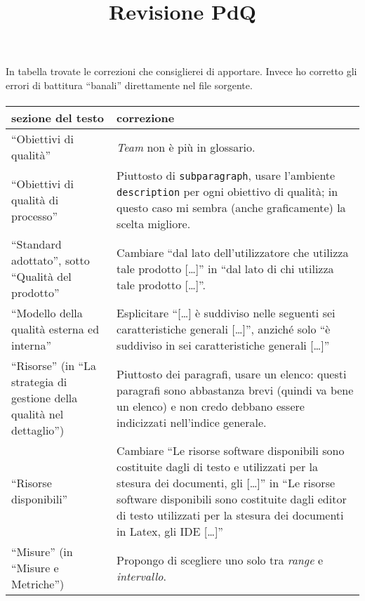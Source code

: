 \documentclass[a4paper]{article}
\title{Revisione PdQ}
\author{\GG}
\begin{document}
\maketitle

\paragraph{}
In tabella trovate le correzioni che consiglierei di apportare. Invece ho corretto gli errori di battitura “banali” direttamente nel file sorgente.

\paragraph{}
\begin{longtable}{| p{3cm} | p{10cm} |}
	\hline
	\textbf{sezione del testo} & \textbf{correzione} \\ \hline
	\hline
	“Obiettivi di qualità” & \emph{Team} non è più in glossario. \\ \hline
	“Obiettivi di qualità di processo” & Piuttosto di \texttt{subparagraph}, usare l'ambiente \texttt{description} per ogni obiettivo di qualità; in questo caso mi sembra (anche graficamente) la scelta migliore. \\ \hline
	“Standard adottato”, sotto “Qualità del prodotto” & Cambiare “dal lato dell’utilizzatore che utilizza tale prodotto [\dots]” in “dal lato di chi utilizza tale prodotto [\dots]”. \\ \hline
	“Modello della qualità esterna ed interna” & Esplicitare “[\dots] è suddiviso nelle seguenti sei caratteristiche generali [\dots]”, anziché solo “è suddiviso in sei caratteristiche generali [\dots]” \\ \hline
	“Risorse” (in “La strategia di gestione della qualità nel dettaglio”) & Piuttosto dei paragrafi, usare un elenco: questi paragrafi sono abbastanza brevi (quindi va bene un elenco) e non credo debbano essere indicizzati nell'indice generale. \\ \hline
	“Risorse disponibili” & Cambiare “Le risorse software disponibili sono costituite dagli \gloss{editor} di testo \gloss{latex} e utilizzati per la stesura dei documenti, gli \gloss{IDE} [\dots]” in “Le risorse software disponibili sono costituite dagli editor di testo utilizzati per la stesura dei documenti in Latex, gli IDE [\dots]” \\ \hline
	“Misure” (in “Misure e Metriche”) & Propongo di scegliere uno solo tra \emph{range} e \emph{intervallo}. \\ \hline

\end{longtable}
\end{document}

